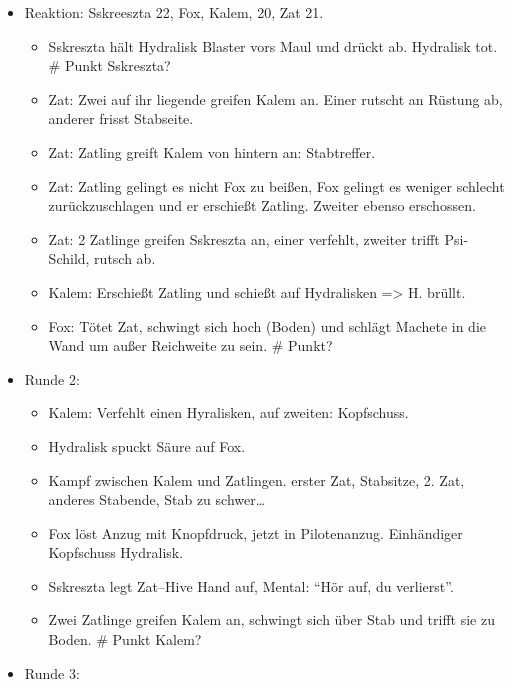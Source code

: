 \documentclass[11pt]{scrartcl}
\begin{document}
\begin{itemize}
\item
  Reaktion: Sskreeszta 22, Fox, Kalem, 20, Zat 21.

  \begin{itemize}
  \item
    Sskreszta hält Hydralisk Blaster vors Maul und drückt ab. Hydralisk
    tot. \# Punkt Sskreszta?
  \item
    Zat: Zwei auf ihr liegende greifen Kalem an. Einer rutscht an
    Rüstung ab, anderer frisst Stabseite.
  \item
    Zat: Zatling greift Kalem von hintern an: Stabtreffer.
  \item
    Zat: Zatling gelingt es nicht Fox zu beißen, Fox gelingt es weniger
    schlecht zurückzuschlagen und er erschießt Zatling. Zweiter ebenso
    erschossen.
  \item
    Zat: 2 Zatlinge greifen Sskreszta an, einer verfehlt, zweiter trifft
    Psi-Schild, rutsch ab.
  \item
    Kalem: Erschießt Zatling und schießt auf Hydralisken =\textgreater{}
    H. brüllt.
  \item
    Fox: Tötet Zat, schwingt sich hoch (Boden) und schlägt Machete in
    die Wand um außer Reichweite zu sein. \# Punkt?
  \end{itemize}
\item
  Runde 2:

  \begin{itemize}
  \item
    Kalem: Verfehlt einen Hyralisken, auf zweiten: Kopfschuss.
  \item
    Hydralisk spuckt Säure auf Fox.
  \item
    Kampf zwischen Kalem und Zatlingen. erster Zat, Stabsitze, 2. Zat,
    anderes Stabende, Stab zu schwer\ldots{}
  \item
    Fox löst Anzug mit Knopfdruck, jetzt in Pilotenanzug. Einhändiger
    Kopfschuss Hydralisk.
  \item
    Sskreszta legt Zat--Hive Hand auf, Mental: ``Hör auf, du
    verlierst''.
  \item
    Zwei Zatlinge greifen Kalem an, schwingt sich über Stab und trifft
    sie zu Boden. \# Punkt Kalem?
  \end{itemize}
\item
  Runde 3:


\end{itemize}
\end{document}
